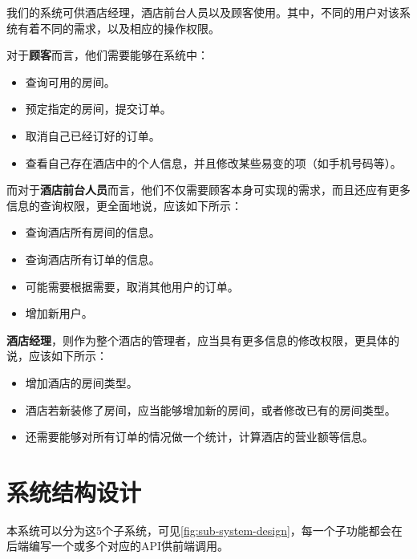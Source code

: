 \documentclass{myreport}
\begin{document}
我们的系统可供酒店经理，酒店前台人员以及顾客使用。其中，不同的用户对该系统有着不同的需求，以及相应的操作权限。

对于\textbf{顾客}而言，他们需要能够在系统中：

\begin{itemize}
    \item 查询可用的房间。
    \item 预定指定的房间，提交订单。
    \item 取消自己已经订好的订单。
    \item 查看自己存在酒店中的个人信息，并且修改某些易变的项（如手机号码等）。
\end{itemize}

而对于\textbf{酒店前台人员}而言，他们不仅需要顾客本身可实现的需求，而且还应有更多信息的查询权限，更全面地说，应该如下所示：


\begin{itemize}
    \item 查询酒店所有房间的信息。
    \item 查询酒店所有订单的信息。
    \item 可能需要根据需要，取消其他用户的订单。 
    \item 增加新用户。
\end{itemize}

\textbf{酒店经理}，则作为整个酒店的管理者，应当具有更多信息的修改权限，更具体的说，应该如下所示：

\begin{itemize}
    \item 增加酒店的房间类型。
    \item 酒店若新装修了房间，应当能够增加新的房间，或者修改已有的房间类型。
    \item 还需要能够对所有订单的情况做一个统计，计算酒店的营业额等信息。
\end{itemize}

\section{系统结构设计}

本系统可以分为这5个子系统，可见\autoref{fig:sub-system-design}，每一个子功能都会在后端编写一个或多个对应的API供前端调用。
\end{document}
